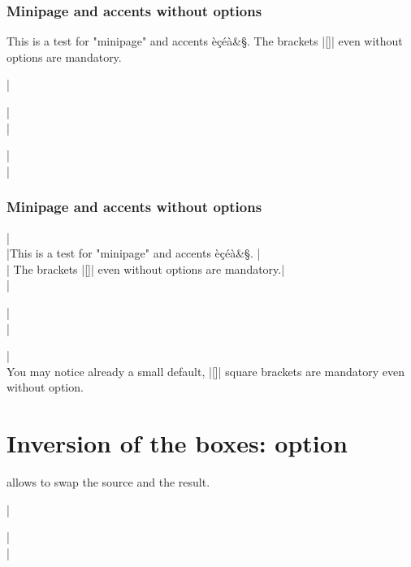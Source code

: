 \documentclass[DIV         = 14,
               fontsize    = 10,
               index       = totoc,
               twoside,
               cadre,
               headings    = small,
               ]{tkz-doc}
\begin{document}
\begin{tkzexample}[]
\begin{minipage}{8cm}
\subsubsection{Minipage and accents  without options}
This is a test for "minipage" and   accents èçéà\&§. 
The brackets |[]| even without options are mandatory.
\end{minipage}
\end{tkzexample}

\vspace{12pt}

|\begin{tkzexample}[]|\\
|\begin{minipage}{8cm}|\\
|\subsubsection{Minipage and accents  without options}|\\
|This is a test for "minipage" and   accents èçéà\&§. |\\
| The brackets |[]| even without options are mandatory.|\\
|\end{minipage}|\\
|\end{tkzexample}|\\

\vspace{12pt}
You may notice already a small default, |[]| square brackets are mandatory even without option. 

\section{Inversion of the boxes: option }

 allows to swap the source and the result. 

|\begin{tkzexample}[overhang]|\\
|
\end{tkzexample}
\end{document}
